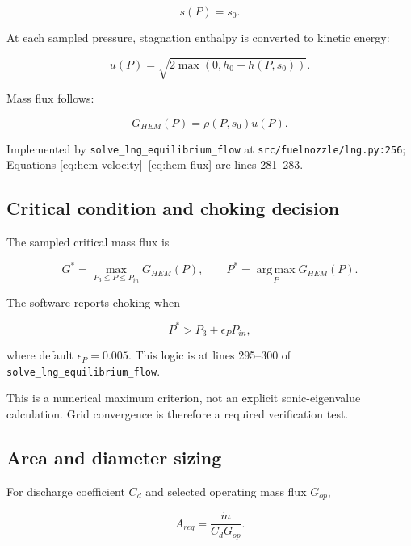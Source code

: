 \documentclass[11pt]{article}
\newcommand{\code}[1]{\nolinkurl{#1}}
\newcommand{\srcline}[2]{\nolinkurl{#1:#2}}
\begin{document}
\begin{equation}
  s(P)=s_0.
  \label{eq:isentropic-path}
\end{equation}

At each sampled pressure, stagnation enthalpy is converted to kinetic energy:

\begin{equation}
  u(P)=\sqrt{2\max\left(0,h_0-h(P,s_0)\right)}.
  \label{eq:hem-velocity}
\end{equation}

Mass flux follows:

\begin{equation}
  G_{HEM}(P)=\rho(P,s_0)u(P).
  \label{eq:hem-flux}
\end{equation}

Implemented by \code{solve_lng_equilibrium_flow} at
\srcline{src/fuelnozzle/lng.py}{256}; Equations
\eqref{eq:hem-velocity}--\eqref{eq:hem-flux} are lines 281--283.

\subsection{Critical condition and choking decision}

The sampled critical mass flux is

\begin{equation}
  G^*=\max_{P_3\leq P\leq P_{in}}G_{HEM}(P),
  \qquad P^*=\operatorname*{arg\,max}_P G_{HEM}(P).
  \label{eq:critical-flux}
\end{equation}

The software reports choking when

\begin{equation}
  P^*>P_3+\epsilon_P P_{in},
  \label{eq:choking-test}
\end{equation}

where default $\epsilon_P=0.005$. This logic is at lines 295--300 of
\code{solve_lng_equilibrium_flow}.

This is a numerical maximum criterion, not an explicit sonic-eigenvalue calculation.
Grid convergence is therefore a required verification test.

\subsection{Area and diameter sizing}

For discharge coefficient $C_d$ and selected operating mass flux $G_{op}$,

\begin{equation}
  A_{req}=\frac{\dot m}{C_dG_{op}}.
  \label{eq:lng-area}
\end{equation}
\end{document}
